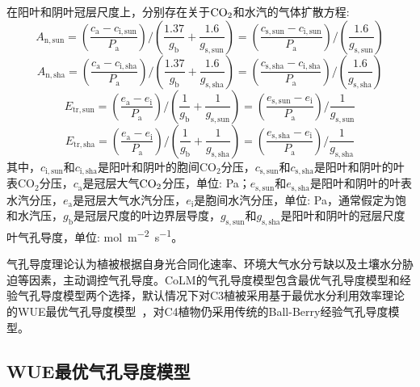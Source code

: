 在阳叶和阴叶冠层尺度上，分别存在关于$\rm CO_2$和水汽的气体扩散方程:
\begin{equation}\label{A_n2_sun}
A_{\mathrm{n,sun}}=\left(\frac{c_{\mathrm{a}}-c_{\mathrm{i,sun}}}{P_{\mathrm {a}}}\right) /\left(\frac{1.37}{g_{\mathrm{b}}} +\frac{1.6}{g_{\mathrm{s,sun}}}\right)=\left(\frac{c_{\mathrm{s,sun}}-c_{\mathrm{i,sun}}}{P_{\mathrm {a}}}\right) /\left(\frac{1.6}{g_{\mathrm{s,sun}}}\right)
\end{equation}
\begin{equation}\label{A_n2_sha}
A_{\mathrm{n,sha}}=\left(\frac{c_{\mathrm{a}}-c_{\mathrm{i,sha}}}{P_{\mathrm {a}}}\right) /\left(\frac{1.37}{g_{\mathrm{b}}} +\frac{1.6}{g_{\mathrm{s,sha}}}\right)=\left(\frac{c_{\mathrm{s,sha}}-c_{\mathrm{i,sha}}}{P_{\mathrm {a}}}\right) /\left(\frac{1.6}{g_{\mathrm{s,sha}}}\right)
\end{equation}
\begin{equation}\label{ea_ei_sun}
E_{\mathrm{tr,sun}}=\left(\frac{e_{\mathrm{a}}-e_{\mathrm{i}}}{P_{\mathrm {a}}}\right) /\left(\frac{1}{g_{\mathrm{b}}}+\frac{1}{g_{\mathrm{s,sun}}}\right)=\left(\frac{e_{\mathrm{s,sun}}-e_{\mathrm{i}}}{P_{\mathrm {a}}}\right) / \frac{1}{g_{\mathrm{s,sun}}}
\end{equation}
\begin{equation}\label{ea_ei_sha}
E_{\mathrm{tr,sha}}=\left(\frac{e_{\mathrm{a}}-e_{\mathrm{i}}}{P_{\mathrm {a}}}\right) /\left(\frac{1}{g_{\mathrm{b}}}+\frac{1}{g_{\mathrm{s,sha}}}\right)=\left(\frac{e_{\mathrm{s,sha}}-e_{\mathrm{i}}}{P_{\mathrm {a}}}\right) / \frac{1}{g_{\mathrm{s,sha}}}
\end{equation}
其中，$c_{\mathrm{i,sun}}$和$c_{\mathrm{i,sha}}$是阳叶和阴叶的胞间CO$_2$分压，$c_{\mathrm{s,sun}}$和$c_{\mathrm{s,sha}}$是阳叶和阴叶的叶表CO$_2$分压，$c_{\mathrm {a}}$是冠层大气$\rm CO_2$分压，单位: Pa；$e_{\mathrm{s,sun}}$和$e_{\mathrm{s,sha}}$是阳叶和阴叶的叶表水汽分压，$e_{\mathrm {a}}$是冠层大气水汽分压，$e_{\mathrm {i}}$是胞间水汽分压，单位: Pa，通常假定为饱和水汽压，$g_{\mathrm {b}}$是冠层尺度的叶边界层导度，$g_{\mathrm{s,sun}}$和$g_{\mathrm{s,sha}}$是阳叶和阴叶的冠层尺度叶气孔导度，单位: \unit{mol.m^{-2}.s^{-1}}。

气孔导度理论认为植被根据自身光合同化速率、环境大气水分亏缺以及土壤水分胁迫等因素，主动调控气孔导度。CoLM的气孔导度模型包含最优气孔导度模型和经验气孔导度模型两个选择，默认情况下对C3植被采用基于最优水分利用效率理论的WUE最优气孔导度模型~\citep{Liang2023}，对C4植物仍采用传统的Ball-Berry经验气孔导度模型。

\subsection{WUE最优气孔导度模型}

